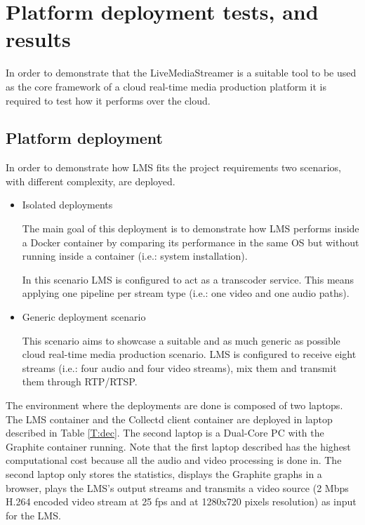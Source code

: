 \chapter{Platform deployment tests, and results}\label{H:platformDeploymentAndDemonstrations}

In order to demonstrate that the LiveMediaStreamer is a suitable tool to be used as the core framework of a cloud real-time media production platform it is required to test how it performs over the cloud.

\section{Platform deployment}

In order to demonstrate how LMS fits the project requirements two scenarios, with different complexity, are deployed.

\begin{itemize}
\item Isolated deployments \hfill

The main goal of this deployment is to demonstrate how LMS performs inside a Docker container by comparing its performance in the same OS but without running inside a container (i.e.: system installation).

In this scenario LMS is configured to act as a transcoder service. This means applying one pipeline per stream type (i.e.: one video and one audio paths).

\item Generic deployment scenario \hfill

This scenario aims to showcase a suitable and as much generic as possible cloud real-time media production scenario. LMS is configured to receive eight streams (i.e.: four audio and four video streams), mix them and transmit them through RTP/RTSP. 
\end{itemize}

The environment where the deployments are done is composed of two laptops. The LMS container and the Collectd client container are deployed in laptop described in Table \ref{T:dec}. The second laptop is a Dual-Core PC with the Graphite container running. Note that the first laptop described has the highest computational cost because all the audio and video processing is done in. The second laptop only stores the statistics, displays the Graphite graphs in a browser, plays the LMS's output streams and transmits a video source (2 Mbps H.264 encoded video stream at 25 fps and at 1280x720 pixels resolution) as input for the LMS.

